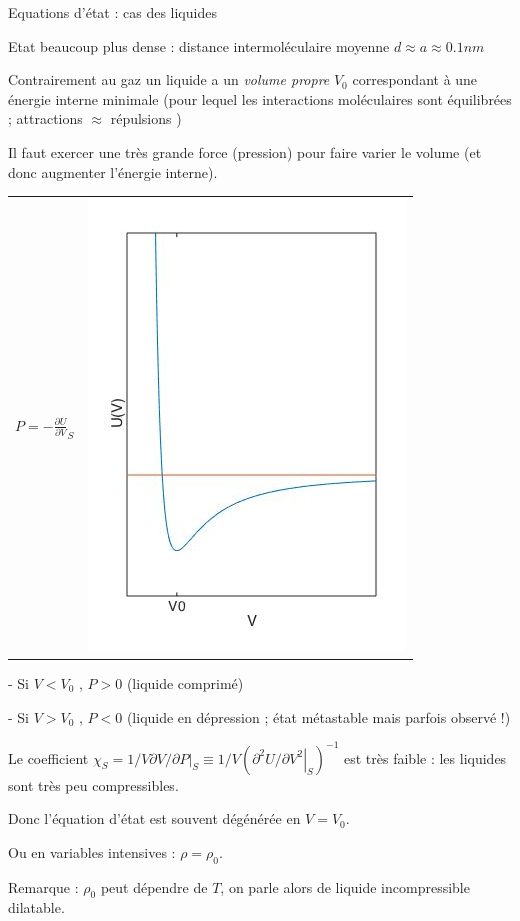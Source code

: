 \begin{frame}{Equations d'état : cas des liquides}

\small 
Etat beaucoup plus dense : distance intermoléculaire moyenne $d \approx a \approx 0.1 nm$

\medskip 
Contrairement au gaz un liquide a un {\em volume propre} $V_0$ correspondant à une énergie interne minimale (pour lequel les interactions moléculaires sont équilibrées ; attractions $\approx$ répulsions )

\medskip

Il faut exercer une très grande force (pression) pour faire varier le volume (et donc augmenter l'énergie interne).

\begin{tabular}{ll}
\begin{minipage}{.5\textwidth}
$ P = -\frac{\partial U}{\partial V}_S $
\end{minipage}
&
\includegraphics[width=0.2\linewidth]{Figures/UV_liquide.jpg}

\end{tabular}

\smallskip 
- Si $V<V_0$ , $P>0$ (liquide comprimé)

\smallskip
- Si $V>V_0$ , $P<0$ (liquide en dépression ; état métastable mais parfois observé !)

\medskip 


Le coefficient 
$ \chi_S = 1/V {\left.\partial V/\partial P\right|}_S \equiv  1/V \left( {\left.\partial^2 U/\partial V^2\right|}_S \right)^{-1}$ 
est très faible : les liquides sont très peu compressibles.

\medskip

Donc l'équation d'état est souvent dégénérée en  $V = V_0$.




\medskip

Ou en variables intensives : $\rho = \rho_0$.

\medskip



Remarque : $\rho_0$ peut dépendre de $T$, on parle alors de liquide incompressible dilatable.


\bigskip





\end{frame}



